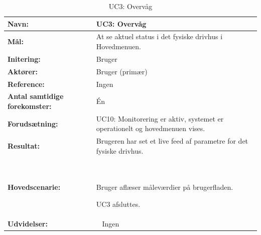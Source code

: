 \begin{table}[h]
\begin{tabularx}{\textwidth}{| >{\raggedright\arraybackslash}p{3.3 cm} | >{\raggedright\arraybackslash}X |} \hline

\textbf{Navn:} 						& UC3: Overvåg\\ \hline
\textbf{Mål:}						& At se aktuel status i det fysiske drivhus i Hovedmenuen. \\ \hline
\textbf{Initering:}					& Bruger \\ \hline
\textbf{Aktører:} 					& Bruger (primær) \\ \hline
\textbf{Reference:} 					& Ingen \\ \hline
\textbf{Antal samtidige forekomster:} & Én \\ \hline
\textbf{Forudsætning:} 				& UC10: Monitorering er aktiv, systemet er operationelt og hovedmenuen vises. \\ \hline
\textbf{Resultat:}					& Brugeren har set et live feed af parametre for det fysiske drivhus. \\ \hline
\textbf{Hovedscenarie:}				& ~

\begin{packed_enum}
\item Bruger aflæser måleværdier på brugerfladen.
\item UC3 afsluttes.
\end{packed_enum} \\ \hline
\textbf{Udvidelser:}				& ~
Ingen \\ \hline
\end{tabularx}

\caption{UC3: Overvåg}
\label{tbl:UC3}
\end{table}

\clearpage


